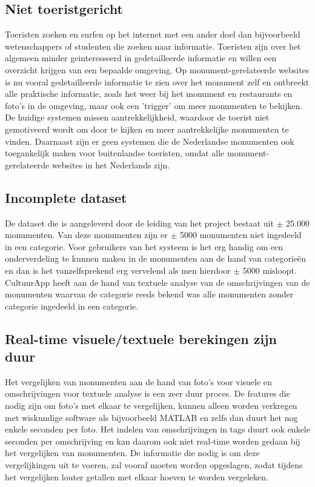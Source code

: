 \documentclass[a4paper,10pt]{article}
\begin{document}
	\subsection{Niet toeristgericht}
	Toeristen zoeken en surfen op het internet met een ander doel dan bijvoorbeeld wetenschappers of studenten die zoeken naar informatie. Toeristen zijn over het algemeen minder geinteresseerd in gedetailleerde informatie en willen een overzicht krijgen van een bepaalde omgeving. Op monument-gerelateerde websites is nu vooral gedetailleerde informatie te zien over het monument zelf en ontbreekt alle praktische informatie, zoals het weer bij het monument en restaurants en foto's in de omgeving, maar ook een 'trigger' om meer monumenten te bekijken. De huidige systemen missen aantrekkelijkheid, waardoor de toerist niet gemotiveerd wordt om door te kijken en meer aantrekkelijke monumenten te vinden. Daarnaast zijn er geen systemen die de Nederlandse monumenten ook toegankelijk maken voor buitenlandse toeristen, omdat alle monument-gerelateerde websites in het Nederlands zijn.
	
	\subsection{Incomplete dataset}
	De dataset die is aangeleverd door de leiding van het project bestaat uit $\pm$ 25.000 monumenten. Van deze monumenten zijn er $\pm$ 5000 monumenten niet ingedeeld in een categorie. Voor gebruikers van het systeem is het erg handig om een onderverdeling te kunnen maken in de monumenten aan de hand van categorie\"en en dan is het vanzelfsprekend erg vervelend als men hierdoor $\pm$ 5000 misloopt. CultuurApp heeft aan de hand van textuele analyse van de omschrijvingen van de monumenten waarvan de categorie reeds bekend was alle monumenten zonder categorie ingedeeld in een categorie.
	
	\subsection{Real-time visuele/textuele berekingen zijn duur}
	Het vergelijken van monumenten aan de hand van foto's voor visuele en omschrijvingen voor textuele analyse is een zeer duur proces. De features die nodig zijn om foto's met elkaar te vergelijken, kunnen alleen worden verkregen met wiskundige software als bijvoorbeeld MATLAB en zelfs dan duurt het nog enkele seconden per foto. Het indelen van omschrijvingen in tags duurt ook enkele seconden per omschrijving en kan daarom ook niet real-time worden gedaan bij het vergelijken van monumenten. De informatie die nodig is om deze vergelijkingen uit te voeren, zal vooraf moeten worden opgeslagen, zodat tijdens het vergelijken louter getallen met elkaar hoeven te worden vergeleken.
\end{document}
